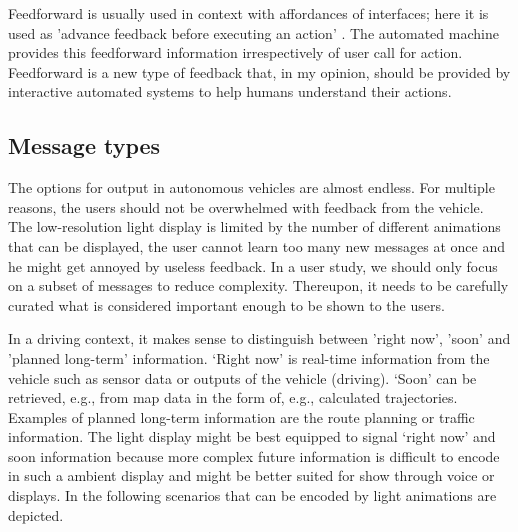 Feedforward is usually used in context with affordances of interfaces; here it is used as 'advance feedback before executing an action' \citep[see][]{Koo2015}. The automated machine provides this feedforward information irrespectively of user call for action. 
Feedforward is a new type of feedback that, in my opinion, should be provided by interactive automated systems to help humans understand their actions. 

\subsection{Message types}
The options for output in autonomous vehicles are almost endless. For multiple reasons, the users should not be overwhelmed with feedback from the vehicle. The low-resolution light display is limited by the number of different animations that can be displayed, the user cannot learn too many new messages at once and he might get annoyed by useless feedback. In a user study, we should only focus on a subset of messages to reduce complexity. Thereupon, it needs to be carefully curated what is considered important enough to be shown to the users.

In a driving context, it makes sense to distinguish between 'right now', 'soon' and 'planned long-term' information. ‘Right now’ is real-time information from the vehicle such as sensor data or outputs of the vehicle (driving). ‘Soon’ can be retrieved, e.g., from map data in the form of, e.g., calculated trajectories. Examples of planned long-term information are the route planning or traffic information. The light display might be best equipped to signal ‘right now’ and soon information because more complex future information is difficult to encode in such a ambient display and might be better suited for show through voice or displays. In the following scenarios that can be encoded by light animations are depicted. 


